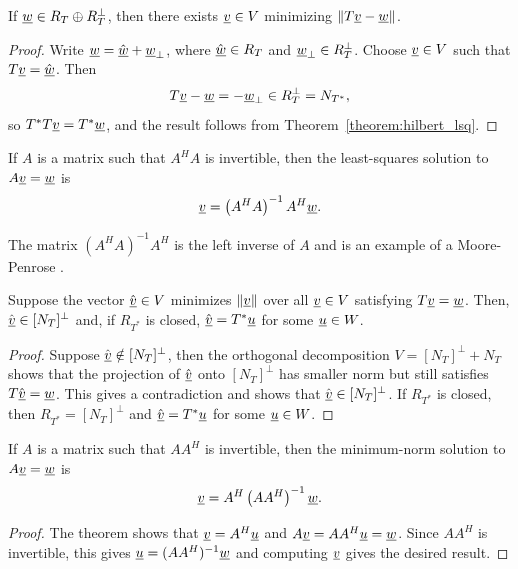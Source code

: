 \begin{corollary} \label{corollary:hilbert_lsq}
If $\underline{w}\in R_T\oplus R_T^\perp$, then there exists
$\underline{v}\in V$ minimizing $\|T\underline{v}-\underline{w}\|$.
\end{corollary}
\begin{proof}
Write $\underline{w}=\hat{\underline{w}}+\underline{w}_\perp$, where
$\hat{\underline{w}}\in R_T$ and $\underline{w}_\perp\in R_T^\perp$.
Choose $\underline{v}\in V$ such that $T\underline{v}=\hat{\underline{w}}$.
Then
\[
T\underline{v}-\underline{w}=-\underline{w}_\perp\in R_T^\perp=N_{T^*},
\]
so $T^*T\underline{v}=T^*\underline{w}$, and the result follows from Theorem~\ref{theorem:hilbert_lsq}.
\end{proof}

\begin{corollary}
If $A$ is a matrix such that $A^H A$ is invertible, then the least-squares solution to $A \underline{v} = \underline{w}$ is
\begin{equation*}
\underline{v} = \left( A^H A \right)^{-1} A^H \underline{w}.
\end{equation*}
\end{corollary}

The matrix $\left( A^H A \right)^{-1} A^H$ is the left inverse of $A$ and is an example of a Moore-Penrose .

\begin{theorem}
Suppose the vector $\hat{\underline{v}} \in V$ minimizes $\| \underline{v} \|$ over all $\underline{v}\in V$ satisfying $T \underline{v} = \underline{w}$.
Then, $\hat{\underline{v}} \in [N_T]^{\bot}$ and, if $R_{T^*}$ is closed, $\hat{\underline{v}} = T^* \underline{u}$ for some $\underline{u}\in W$.
\end{theorem}
\begin{proof}
Suppose $\hat{\underline{v}} \notin [N_T]^{\bot}$, then the orthogonal decomposition $V = [N_T]^{\bot} + N_T$ shows that the projection of $\hat{\underline{v}}$ onto $[N_T]^{\bot}$ has smaller norm but still satisfies $T \hat{\underline{v}} = \underline{w}$.
This gives a contradiction and shows that $\hat{\underline{v}} \in [N_T]^{\bot}$.
If $R_{T^*}$ is closed, then $R_{T^*} = [N_T]^{\bot}$ and $\hat{\underline{v}} = T^* \underline{u}$ for some $\underline{u}\in W$.
\end{proof}

\begin{corollary}
If $A$ is a matrix such that $A A^H$ is invertible, then the minimum-norm solution to $A \underline{v} = \underline{w}$ is
\begin{equation*}
\underline{v} = A^H \left( A A^H \right)^{-1} \underline{w}.
\end{equation*}
\end{corollary}
\begin{proof}
The theorem shows that $\underline{v} = A^H \underline{u}$ and $A \underline{v} = A A^H \underline{u} = \underline{w}$.
Since $A A^H$ is invertible, this gives $\underline{u} = (A A^H)^{-1} \underline{w}$ and computing $\underline{v}$ gives the desired result.
\end{proof}

